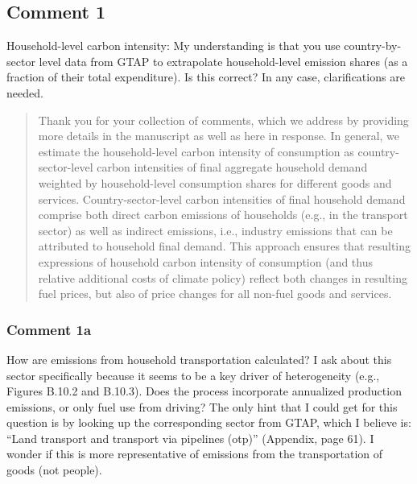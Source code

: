 \documentclass[11pt]{article}
\newenvironment{response}
{\begin{quote}\color{black}}
{\end{quote}}
\begin{document}
\subsection*{Comment 1}\label{comment_R2_1}

\begin{commentbox}
    Household-level carbon intensity: My understanding is that you use country-by-sector level data from GTAP to extrapolate household-level emission shares (as a fraction of their total expenditure). Is this correct? In any case, clarifications are needed.
\end{commentbox}

\begin{response}
    Thank you for your collection of comments, which we address by providing more details in the manuscript as well as here in response. In general, we estimate the household-level carbon intensity of consumption as country-sector-level carbon intensities of final aggregate household demand weighted by household-level consumption shares for different goods and services. Country-sector-level carbon intensities of final household demand comprise both direct carbon emissions of households (e.g., in the transport sector) as well as indirect emissions, i.e., industry emissions that can be attributed to household final demand. This approach ensures that resulting expressions of household carbon intensity of consumption (and thus relative additional costs of climate policy) reflect both changes in resulting fuel prices, but also of price changes for all non-fuel goods and services.

\end{response}

\subsubsection*{Comment 1a}\label{comment_R2_1a}

\begin{commentbox}
    How are emissions from household transportation calculated? I ask about this sector specifically because it seems to be a key driver of heterogeneity (e.g., Figures B.10.2 and B.10.3). Does the process incorporate annualized production emissions, or only fuel use from driving? The only hint that I could get for this question is by looking up the corresponding sector from GTAP, which I believe is: “Land transport and transport via pipelines (otp)” (Appendix, page 61). I wonder if this is more representative of emissions from the transportation of goods (not people).
\end{commentbox}
\end{document}

